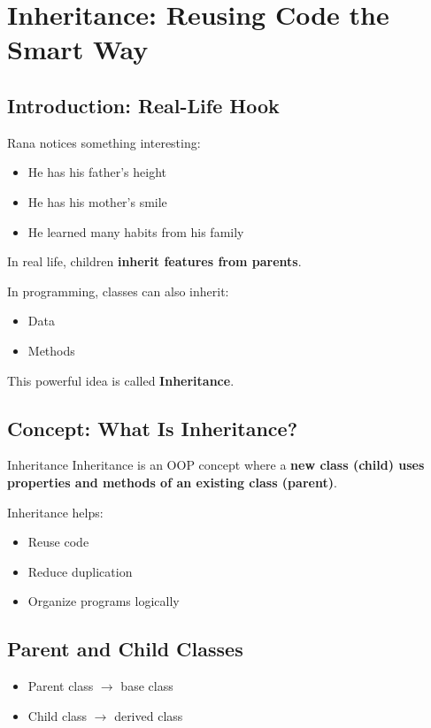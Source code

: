 \chapter{Inheritance: Reusing Code the Smart Way}

\section{Introduction: Real-Life Hook}

Rana notices something interesting:
\begin{itemize}
    \item He has his father’s height
    \item He has his mother’s smile
    \item He learned many habits from his family
\end{itemize}

In real life, children \textbf{inherit features from parents}.

In programming, classes can also inherit:
\begin{itemize}
    \item Data
    \item Methods
\end{itemize}

This powerful idea is called \textbf{Inheritance}.

\section{Concept: What Is Inheritance?}

\begin{definition}{Inheritance}
Inheritance is an OOP concept where a \textbf{new class (child) uses properties and methods of an existing class (parent)}.
\end{definition}

Inheritance helps:
\begin{itemize}
    \item Reuse code
    \item Reduce duplication
    \item Organize programs logically
\end{itemize}

\section{Parent and Child Classes}

\begin{itemize}
    \item Parent class $\rightarrow$ base class
    \item Child class $\rightarrow$ derived class
\end{itemize}

